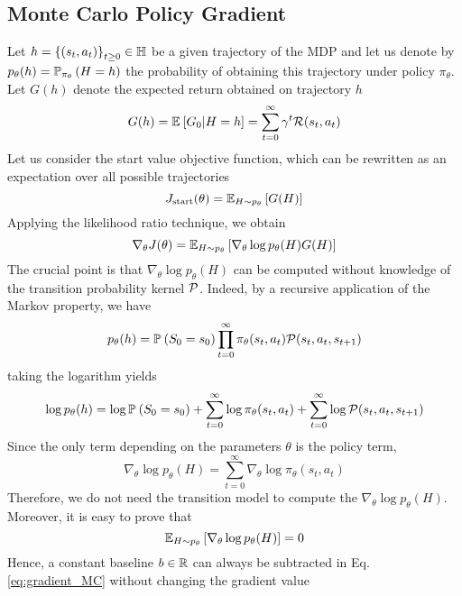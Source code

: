 \subsection{Monte Carlo Policy Gradient}
\label{sec:MCPG}
Let $h = {\{(s_t, a_t)\}}_{t\geq 0} \in \H$ be a given trajectory of the MDP and let us 
denote by $p_\theta(h) = \P[\pi_\theta]{H = h}$ the probability of obtaining 
this trajectory under policy $\pi_\theta$. Let $G(h)$ denote the expected return obtained on trajectory $h$
\begin{equation*}
	G(h) = \E{G_0 | H = h} = \sum_{t=0}^\infty \gamma^t \calR(s_t,
	a_t) 
\end{equation*}
Let us consider the start value objective function, which can be rewritten as an expectation over all possible trajectories
\begin{equation*}
	J_{\text{start}}(\theta) = \E[H \sim p_\theta]{G(H)}
\end{equation*}
Applying the likelihood ratio technique, we obtain
\begin{equation}
\label{eq:gradient_MC}
		\nabla_\theta J(\theta) = \E[H\sim p_\theta]{\nabla_\theta \log p_\theta(H)G(H)}
\end{equation}
The crucial point is that $\nabla_\theta \log p_\theta(H)$ can be computed without
knowledge of the transition probability kernel $\calP$. Indeed, by a recursive application of the Markov property, we have
\begin{equation*}
	p_\theta(h) = \P{S_0 = s_0} \prod_{t=0}^\infty \pi_\theta(s_t, a_t)
	\calP(s_t, a_t, s_{t+1})
\end{equation*}
taking the logarithm yields
\begin{equation*}
	\log p_\theta(h) = \log \P{S_0 = s_0} + \sum_{t=0}^\infty \log 
	\pi_\theta(s_t, a_t) + \sum_{t=0}^\infty \log \calP(s_t, a_t, s_{t+1})
\end{equation*}
Since the only term depending on the parameters $\theta$ is the policy term,
\begin{equation}
	\nabla_\theta \log p_\theta(H) = \sum_{t=0}^\infty \nabla_\theta \log 
	\pi_\theta(s_t, a_t)
\end{equation}
Therefore, we do not need the transition model to compute the $\nabla_\theta \log 
p_\theta(H)$. Moreover, it is easy to prove that
\begin{equation}
\label{eq:likelihood_bias}
	\E[H\sim p_\theta]{\nabla_\theta \log p_\theta(H)} = 0	
\end{equation}
Hence, a constant baseline $b \in \R$ can always be subtracted in Eq. \ref{eq:gradient_MC} without changing the gradient value
